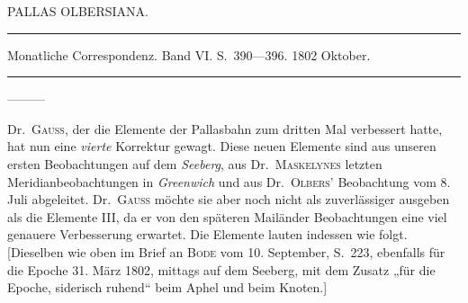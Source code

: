%
\bigskip{}
\begin{center}
PALLAS OLBERSIANA.\par
\medskip\hrule\medskip
Monatliche Correspondenz. Band VI. S.\ 390—396. 1802 Oktober.\par
\medskip\hrule
\end{center}\medskip
—\quad —\quad —

Dr.\ \textsc{Gauß}, der die Elemente der Pallasbahn zum dritten Mal verbessert hatte, hat nun eine \textit{vierte} Korrektur gewagt. Diese neuen Elemente sind aus unseren ersten Beobachtungen auf dem \textit{Seeberg}, aus Dr.\ \textsc{Maskelynes} letzten Meridianbeobachtungen in \textit{Greenwich} und aus Dr.\ \textsc{Olbers}’ Beobachtung vom 8. Juli abgeleitet. Dr.\ \textsc{Gauß} möchte sie aber noch nicht als zuverlässiger ausgeben als die Elemente III, da er von den späteren Mailänder Beobachtungen eine viel genauere Verbesserung erwartet. Die Elemente lauten indessen wie folgt. [Dieselben wie oben im Brief an \textsc{Bode} vom 10. September, S.\ 223, ebenfalls für die Epoche 31. März 1802, mittags auf dem Seeberg, mit dem Zusatz „für die Epoche, siderisch ruhend“ beim Aphel und beim Knoten.]

